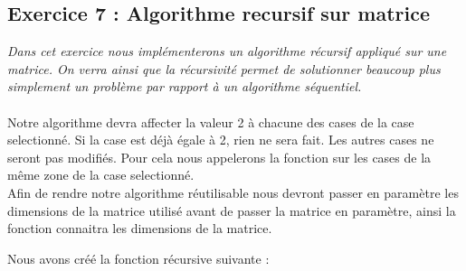 \subsection{Exercice 7 : Algorithme recursif sur matrice}
\textit{Dans cet exercice nous implémenterons un algorithme récursif appliqué sur une matrice. On verra ainsi que la récursivité permet de solutionner beaucoup plus simplement un problème par rapport à un algorithme séquentiel.}
\\\\
Notre algorithme devra affecter la valeur 2 à chacune des cases de la case selectionné.
Si la case est déjà égale à 2, rien ne sera fait.
Les autres cases ne seront pas modifiés.
Pour cela nous appelerons la fonction sur les cases de la même zone de la case selectionné.\\

Afin de rendre notre algorithme réutilisable nous devront passer en paramètre les dimensions de la matrice utilisé avant de passer la matrice en paramètre, ainsi la fonction connaitra les dimensions de la matrice.

Nous avons créé la fonction récursive suivante :

\inputminted[linenos,firstline=8,lastline=25]{cpp}{../sources/cpp/TP1-2/bubbleBreaker.c}
